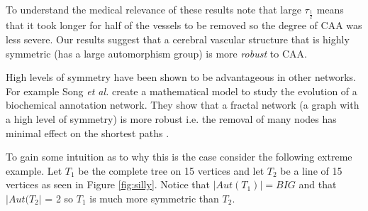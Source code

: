 \documentclass[12pt]{article} %
\theoremstyle{definition}
\begin{document}
To understand the medical relevance of these results note that large $\tau_{\frac{1}{2}}$ means that it took longer for half of the vessels to be removed so the degree of CAA was less severe.  Our results suggest that a cerebral vascular structure that is highly symmetric (has a large automorphism group) is more \emph{robust} to CAA.  

High levels of symmetry have been shown to be advantageous in other networks.  For example Song \emph{et al.} create a mathematical model to study the evolution of a biochemical annotation network. They show that a fractal network (a graph with a high level of symmetry) is more robust  i.e. the removal of many nodes has minimal effect on the shortest paths \cite{Song}.  

To gain some intuition as to why this is the case consider the following extreme example.  Let $T_{1}$ be the complete tree on 15 vertices and let $T_{2}$ be a line of 15 vertices as seen in Figure \ref{fig:silly}.  Notice that $|Aut(T_{1})| = BIG$ and that $|Aut(T_{2}|$ = 2 so $T_{1}$ is much more symmetric than $T_{2}$.  
\end{document}
